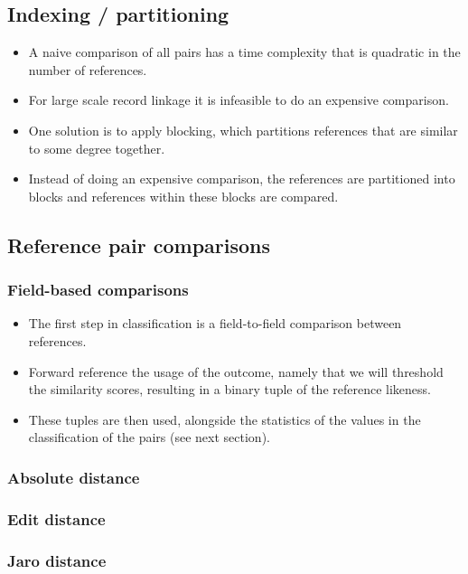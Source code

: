 \documentclass[paper=a4, fontsize=11pt]{scrartcl}
\begin{document}
\subsection{Indexing / partitioning}
\begin{itemize}
    \item A naive comparison of all pairs has a time complexity that is quadratic in the number of references.
    \item For large scale record linkage it is infeasible to do an expensive comparison.
    \item One solution is to apply blocking, which partitions references that are similar to some degree together.
    \item Instead of doing an expensive comparison, the references are partitioned into blocks and references within these blocks are compared.
\end{itemize}

\subsection{Reference pair comparisons}

\subsubsection{Field-based comparisons}
\begin{itemize}
    \item The first step in classification is a field-to-field comparison between references.
    \item Forward reference the usage of the outcome, namely that we will threshold the similarity scores, resulting in a binary tuple of the reference likeness.
    \item These tuples are then used, alongside the statistics of the values in the classification of the pairs (see next section).
\end{itemize}

\subsubsection{Absolute distance}
\subsubsection{Edit distance}
\subsubsection{Jaro distance}
\end{document}
